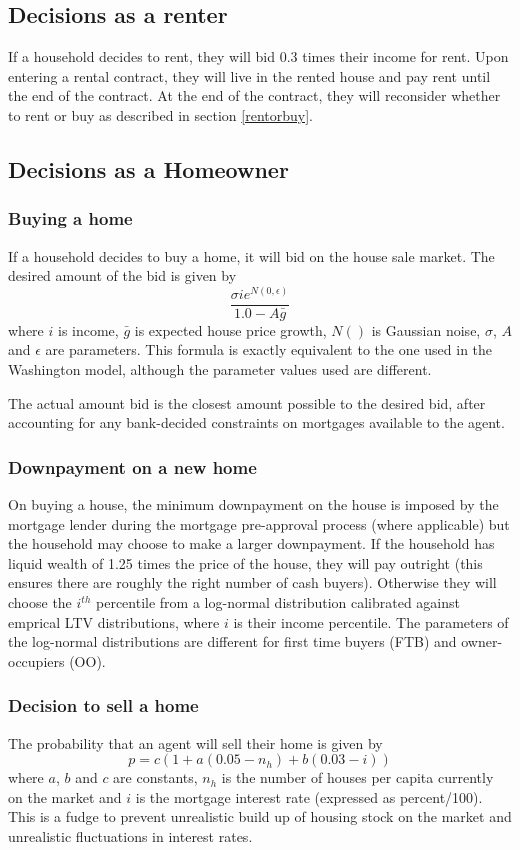 \documentclass{article}
\begin{document}
\subsection{Decisions as a renter}
If a household decides to rent, they will bid 0.3 times their income for rent. Upon entering a rental contract, they will live in the rented house and pay rent until the end of the contract. At the end of the contract, they will reconsider whether to rent or buy as described in section \ref{rentorbuy}.

\subsection{Decisions as a Homeowner}

\subsubsection{Buying a home}
\label{buyahome}
If a household decides to buy a home, it will bid on the house sale market. The desired amount of the bid is given by
\[
 \frac{\sigma i e^{N(0,\epsilon)}}{1.0 - A\bar{g}}
\]
where $i$ is income, $\bar{g}$ is expected house price growth, $N()$ is Gaussian noise, $\sigma$, $A$ and $\epsilon$ are parameters. This formula is exactly equivalent to the one used in the Washington model, although the parameter values used are different.

The actual amount bid is the closest amount possible to the desired bid, after accounting for any bank-decided constraints on mortgages available to the agent.

\subsubsection{Downpayment on a new home}
\label{downpayment}
On buying a house, the minimum downpayment on the house is imposed by the mortgage lender during the mortgage pre-approval process (where applicable) but the household may choose to make a larger downpayment. If the household has liquid wealth of 1.25 times the price of the house, they will pay outright (this ensures there are roughly the right number of cash buyers). Otherwise they will choose the $i^{th}$ percentile from a log-normal distribution calibrated against emprical LTV distributions, where $i$ is their income percentile. The parameters of the log-normal distributions are different for first time buyers (FTB) and owner-occupiers (OO).

\subsubsection{Decision to sell a home}
The probability that an agent will sell their home is given by
\begin{equation}
p = c(1 + a(0.05-n_h) + b(0.03-i))
\label{sellhome}
\end{equation}
where $a$, $b$ and $c$ are constants, $n_h$ is the number of houses per capita currently on the market and $i$ is the mortgage interest rate (expressed as percent/100). This is a fudge to prevent unrealistic build up of housing stock on the market and unrealistic fluctuations in interest rates.
\end{document}
